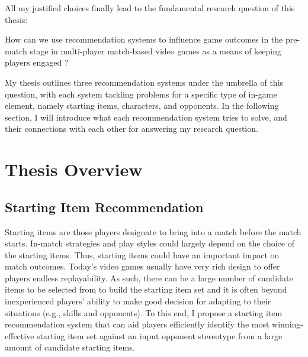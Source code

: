 All my justified choices finally lead to the fundamental research question of this thesis:

\begin{displayquote}
How can we use recommendation systems to influence game outcomes in the pre-match stage in multi-player match-based video games as a means of keeping players engaged ?
\end{displayquote}


My thesis outlines three recommendation systems under the umbrella of this question, with each system tackling problems for a specific type of in-game element, namely starting items, characters, and opponents. In the following section, I will introduce what each recommendation system tries to solve, and their connections with each other for answering my research question.

\section{Thesis Overview}\label{sec:thesis_overview}

\subsection{Starting Item Recommendation}\label{sec:thesis_overview:item_recom}

Starting items are those players designate to bring into a match before the match starts. In-match strategies and play styles could largely depend on the choice of the starting items. Thus, starting items could have an important impact on match outcomes. Today's video games usually have very rich design to offer players endless replayability. As such, there can be a large number of candidate items to be selected from to build the starting item set and it is often beyond inexperienced players' ability to make good decision for adapting to their situations (e.g., skills and opponents). To this end, I propose a starting item recommendation system that can aid players efficiently identify the most winning-effective starting item set against an input opponent stereotype from a large amount of candidate starting items. 

